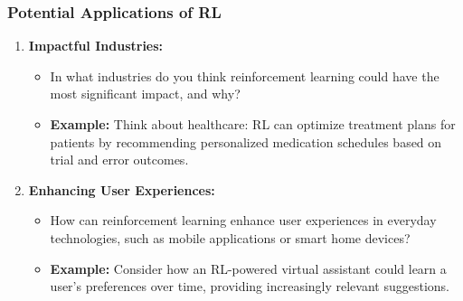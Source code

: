 \documentclass[aspectratio=169]{beamer}
\begin{document}
\begin{frame}[fragile]
  \frametitle{Potential Applications of RL}
  \begin{enumerate}
    \item \textbf{Impactful Industries:}
      \begin{itemize}
        \item In what industries do you think reinforcement learning could have the most significant impact, and why?
        \item \textbf{Example:} Think about healthcare: RL can optimize treatment plans for patients by recommending personalized medication schedules based on trial and error outcomes.
      \end{itemize}
    
    \item \textbf{Enhancing User Experiences:}
      \begin{itemize}
        \item How can reinforcement learning enhance user experiences in everyday technologies, such as mobile applications or smart home devices?
        \item \textbf{Example:} Consider how an RL-powered virtual assistant could learn a user's preferences over time, providing increasingly relevant suggestions.
      \end{itemize}
  \end{enumerate}
\end{frame}
\end{document}
